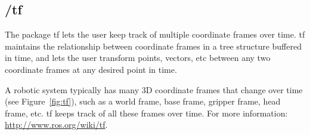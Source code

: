 \subsection{/tf}
\label{sec:tf}

The package tf lets the user keep track of multiple coordinate frames over time. tf maintains the relationship between coordinate frames in a tree structure buffered in time, and lets the user transform points, vectors, etc between any two coordinate frames at any desired point in time.

A robotic system typically has many 3D coordinate frames that change over time (see Figure~\ref{fig:tf}), such as a world frame, base frame, gripper frame, head frame, etc. tf keeps track of all these frames over time.
For more information: \url{http://www.ros.org/wiki/tf}.


